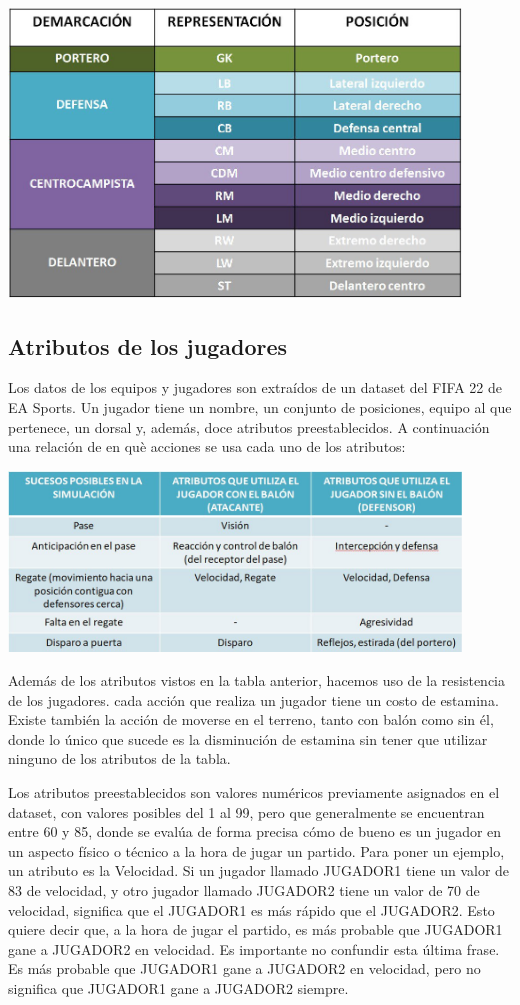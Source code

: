 \documentclass{article}
\begin{document}
\includegraphics*[width=0.9\textwidth]{report_table.jpg}
\bigskip


\subsection{Atributos de los jugadores}
Los datos de los equipos y jugadores son extraídos de un dataset del FIFA 22 de EA Sports. Un jugador tiene un nombre, 
un conjunto de posiciones, equipo al que pertenece, un dorsal y, además, doce atributos preestablecidos. A 
continuación una relación de en què acciones se usa cada uno de los atributos:

\includegraphics*[width=0.9\textwidth]{attributed_table.jpg}
\bigskip

Además de los atributos vistos en la tabla anterior, hacemos uso de la resistencia de los jugadores. cada acción que realiza un jugador tiene un costo de estamina. Existe también la acción de moverse en  el terreno, tanto con balón como sin él, donde lo único que sucede es la disminución de estamina sin tener que utilizar ninguno de los atributos de la tabla.

Los atributos preestablecidos son valores numéricos previamente asignados en el dataset, con valores posibles del 1 al 
99, pero que generalmente se encuentran entre 60 y 85, donde se evalúa de forma precisa cómo de bueno es un jugador en 
un aspecto físico o técnico a la hora de jugar un partido. Para poner un ejemplo, un atributo es la Velocidad. Si un 
jugador llamado JUGADOR1 tiene un valor de 83 de velocidad, y otro jugador llamado JUGADOR2 tiene un valor de 70 de 
velocidad, significa que el JUGADOR1 es más rápido que el JUGADOR2. Esto quiere decir que, a la hora de jugar el 
partido, es más probable que JUGADOR1 gane a JUGADOR2 en velocidad. Es importante no confundir esta última frase. 
Es más probable que JUGADOR1 gane a JUGADOR2 en velocidad, pero no significa que JUGADOR1 gane a JUGADOR2 siempre.
\end{document}
